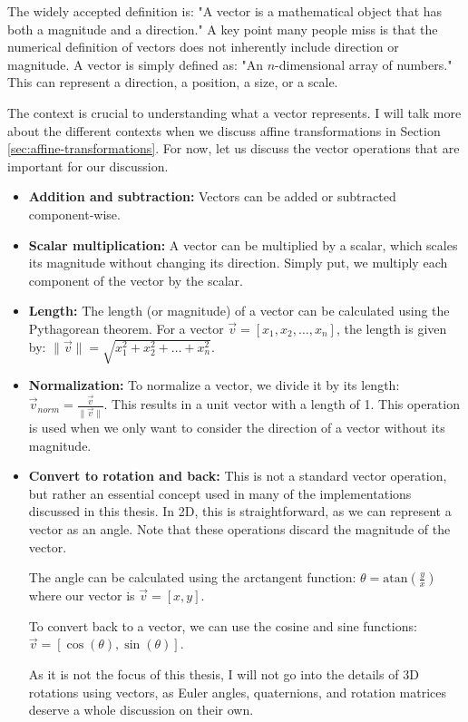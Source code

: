 The widely accepted definition is: "A vector is a mathematical object that has both a magnitude and a direction." A key point many people miss is that the numerical definition of vectors does not inherently include direction or magnitude. A vector is simply defined as: "An \(n\)-dimensional array of numbers." This can represent a direction, a position, a size, or a scale.

The context is crucial to understanding what a vector represents. I will talk more about the different contexts when we discuss affine transformations in Section \ref{sec:affine-transformations}. For now, let us discuss the vector operations that are important for our discussion.

\begin{itemize}
    \item \textbf{Addition and subtraction:} Vectors can be added or subtracted component-wise.
    
    \item \textbf{Scalar multiplication:} A vector can be multiplied by a scalar, which scales its magnitude without changing its direction. Simply put, we multiply each component of the vector by the scalar.
    
    \item \textbf{Length:} The length (or magnitude) of a vector can be calculated using the Pythagorean theorem. For a vector \(\vec{v} = [x_1, x_2, \ldots, x_n]\), the length is given by: \(\|\vec{v}\| = \sqrt{x_1^2 + x_2^2 + \ldots + x_n^2}\).
    
    \pagebreak

    \item \textbf{Normalization: } To normalize a vector, we divide it by its length: \(\vec{v}_{norm} = \frac{\vec{v}}{\|\vec{v}\|}\). This results in a unit vector with a length of 1. This operation is used when we only want to consider the direction of a vector without its magnitude.

    \item \textbf{Convert to rotation and back: } This is not a standard vector operation, but rather an essential concept used in many of the implementations discussed in this thesis. In 2D, this is straightforward, as we can represent a vector as an angle. Note that these operations discard the magnitude of the vector.
    
    The angle can be calculated using the arctangent function: \(\theta = \text{atan}(\frac{y}{x})\) where our vector is \(\vec{v}=[x,y]\). 
    
    To convert back to a vector, we can use the cosine and sine functions: \(\vec{v} = [\cos(\theta), \sin(\theta)]\). 
        
    As it is not the focus of this thesis, I will not go into the details of 3D rotations using vectors, as Euler angles, quaternions, and rotation matrices deserve a whole discussion on their own.
\end{itemize}

